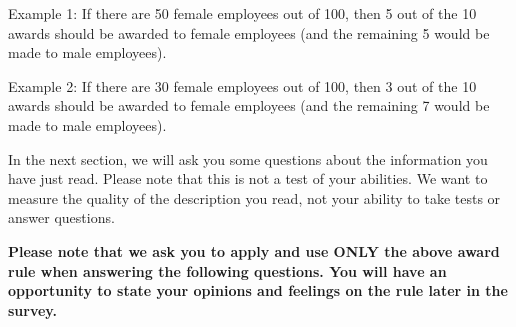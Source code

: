 \documentclass{article}
\begin{document}
Example 1: If there are 50 female employees out of 100, then 5 out of the 10 awards should be awarded to female employees (and the remaining 5 would be made to male employees).

Example 2: If there are 30 female employees out of 100, then 3 out of the 10 awards should be awarded to female employees (and the remaining 7 would be made to male employees).

In the next section, we will ask you some questions about the information you have just read. Please note that this is not a test of your abilities. We want to measure the quality of the description you read, not your ability to take tests or answer questions.

\textbf{Please note that we ask you to apply and use ONLY the above award rule when answering the following questions. You will have an opportunity to state your opinions and feelings on the rule later in the survey.}
\end{document}
